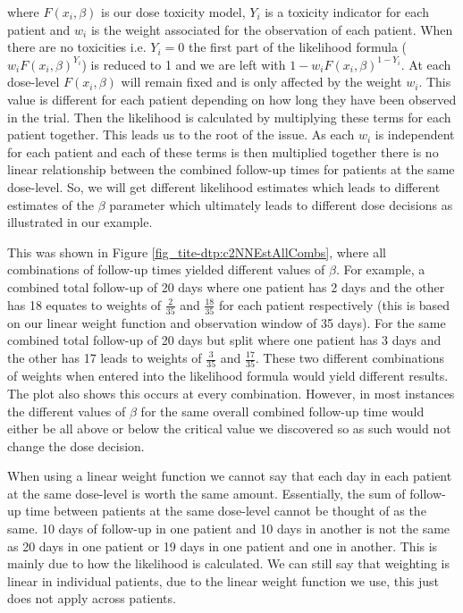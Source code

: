 where $F(x_i, \beta)$ is our dose toxicity model, $Y_i$ is a toxicity indicator for each patient and $w_i$ is the weight associated for the observation of each patient. When there are no toxicities i.e. $Y_i = 0$ the first part of the likelihood formula ($w_iF(x_i,\beta)^{Y_i}$) is reduced to 1 and we are left with $1- w_iF(x_i,\beta)^{1-Y_i}$. At each dose-level $F(x_i, \beta)$ will remain fixed and is only affected by the weight $w_i$. This value is different for each patient depending on how long they have been observed in the trial. Then the likelihood is calculated by multiplying these terms for each patient together. This leads us to the root of the issue. As each $w_i$ is independent for each patient and each of these terms is then multiplied together there is no linear relationship between the combined follow-up times for patients at the same dose-level. So, we will get different likelihood estimates which leads to different estimates of the $\beta$ parameter which ultimately leads to different dose decisions as illustrated in our example. 

This was shown in Figure \ref{fig_tite-dtp:c2NNEstAllCombs}, where all combinations of follow-up times yielded different values of $\beta$. For example, a combined total follow-up of 20 days where one patient has 2 days and the other has 18 equates to weights of $\frac{2}{35}$ and $\frac{18}{35}$ for each patient respectively (this is based on our linear weight function and observation window of 35 days). For the same combined total follow-up of 20 days but split where one patient has 3 days and the other has 17 leads to weights of $\frac{3}{35}$ and $\frac{17}{35}$. These two different combinations of weights when entered into the likelihood formula would yield different results. The plot also shows this occurs at every combination. However, in most instances the different values of $\beta$ for the same overall combined follow-up time would either be all above or below the critical value we discovered so as such would not change the dose decision. 

When using a linear weight function we cannot say that each day in each patient at the same dose-level is worth the same amount. Essentially, the sum of follow-up time between patients at the same dose-level cannot be thought of as the same. 10 days of follow-up in one patient and 10 days in another is not the same as 20 days in one patient or 19 days in one patient and one in another. This is mainly due to how the likelihood is calculated. We can still say that weighting is linear in individual patients, due to the linear weight function we use, this just does not apply across patients. 
 
